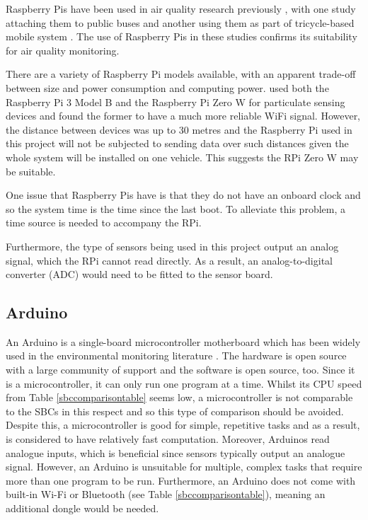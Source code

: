 \documentclass[11pt,twosided,a4paper]{report}
\begin{document}
Raspberry Pis have been used in air quality research previously \citep{ibrahim2015IOTenvmon,Balasubramaniyan2016AQMS_RPi,Rahman2017adaptivesensingRPi,thorpe2017RPimesh,alkandari2018airqualityexperimental}, with one study attaching them to public buses \citep{2014busairqualityVSN} and another using them as part of tricycle-based mobile system \citep{Jabbar2017bikefossarchitecture}. The use of Raspberry Pis in these studies confirms its suitability for air quality monitoring.

There are a variety of Raspberry Pi models available, with an apparent trade-off between size and power consumption and computing power. \cite{thorpe2017RPimesh} used both the Raspberry Pi 3 Model B and the Raspberry Pi Zero W for particulate sensing devices and found the former to have a much more reliable WiFi signal. However, the distance between devices was up to 30 metres and the Raspberry Pi used in this project will not be subjected to sending data over such distances given the whole system will be installed on one vehicle. This suggests the RPi Zero W may be suitable.
   
One issue that Raspberry Pis have is that they do not have an onboard clock and so the system time is the time since the last boot. To alleviate this problem, a time source is needed to accompany the RPi.

Furthermore, the type of sensors being used in this project output an analog signal, which the RPi cannot read directly. As a result, an analog-to-digital converter (ADC) would need to be fitted to the sensor board.

\subsection{Arduino}

An Arduino is a single-board microcontroller motherboard which has been widely used in the environmental monitoring literature \citep{2014busairqualityVSN,Devarakonda2013,Balasubramaniyan2016AQMS_RPi,sun2016HKmarathonML,Ferdoush2014rasppiandarduino,Lee2014arduinorestful,Alvear2016ecosensor,Fuertes2016realtime,Piedrahita2014quantexposuremtrng,Abraham2014costeffindoor}. The hardware is open source with a large community of support and the software is open source, too. Since it is a microcontroller, it can only run one program at a time. Whilst its CPU speed from Table \ref{sbccomparisontable} seems low, a microcontroller is not comparable to the SBCs in this respect and so this type of comparison should be avoided. Despite this, a microcontroller is good for simple, repetitive tasks and as a result, is considered to have relatively fast computation. Moreover, Arduinos read analogue inputs, which is beneficial since sensors typically output an analogue signal. However, an Arduino is unsuitable for multiple, complex tasks that require more than one program to be run. Furthermore, an Arduino does not come with built-in Wi-Fi or Bluetooth (see Table \ref{sbccomparisontable}), meaning an additional dongle would be needed.
\end{document}

